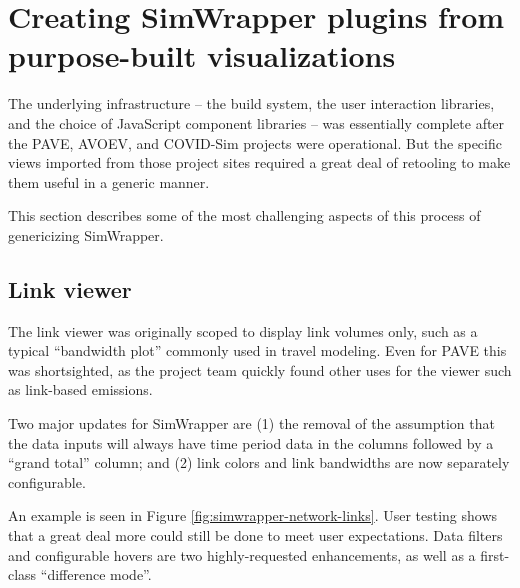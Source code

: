 \hypertarget{simwrapper-converting-purpose-built-visualizations-into-generic-data-viewers}{%
\section{Creating SimWrapper plugins from purpose-built visualizations}
\label{simwrapper-converting-purpose-built-visualizations-into-generic-data-viewers}}

The underlying infrastructure -- the build system, the user interaction libraries, and the choice of JavaScript component libraries -- was essentially complete after the PAVE, AVOEV, and COVID-Sim projects were operational. But the specific views imported from those project sites required a great deal of retooling to make them useful in a generic manner.

This section describes some of the most challenging aspects of this process of genericizing SimWrapper.


\hypertarget{simwrapper-link-viewer}{%
\subsection{Link viewer}\label{simwrapper-link-viewer}}

The link viewer was originally scoped to display link volumes only, such as a typical ``bandwidth plot'' commonly used in travel modeling. Even for PAVE this was shortsighted, as the project team quickly found other uses for the viewer such as link-based emissions.

Two major updates for SimWrapper are (1) the removal of the assumption that the data inputs will always have time period data in the columns followed by a ``grand total'' column; and (2) link colors and link bandwidths are now separately configurable.

An example is seen in Figure \ref{fig:simwrapper-network-links}. User testing shows that a great deal more could still be done to meet user expectations. Data filters and configurable hovers are two highly-requested enhancements, as well as a first-class ``difference mode''.  

